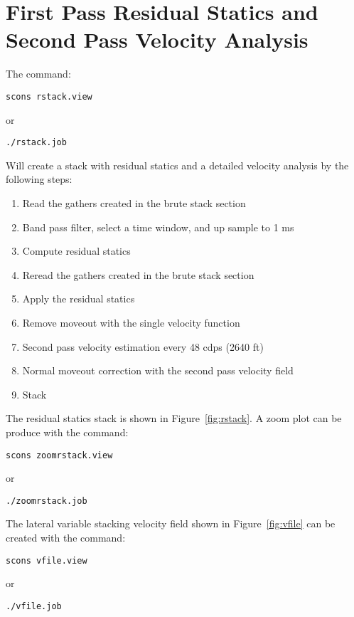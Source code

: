 
\section{First Pass Residual Statics and Second Pass Velocity Analysis}
The command:
\begin{verbatim}
scons rstack.view
\end{verbatim}
or
\begin{verbatim}
./rstack.job
\end{verbatim}
Will create a stack with residual statics and a detailed velocity analysis 
by the following steps:
\begin{enumerate}
\item Read the gathers created in the brute stack section
\item Band pass filter, select a time window, and up sample to 1 ms
\item Compute residual statics
\item Reread the gathers created in the brute stack section
\item Apply the residual statics
\item Remove moveout with the single velocity function 
\item Second pass velocity estimation every 48 cdps (2640 ft)
\item Normal moveout correction with the second pass velocity field 
\item Stack
\end{enumerate}

The residual statics stack is shown in Figure~\ref{fig:rstack}.  A zoom 
plot can be produce with the command:\\
\begin{verbatim}
scons zoomrstack.view
\end{verbatim}
or
\begin{verbatim}
./zoomrstack.job
\end{verbatim}


The lateral variable stacking velocity field shown in Figure~\ref{fig:vfile} 
can be created with the command:\\
\begin{verbatim}
scons vfile.view
\end{verbatim}
or
\begin{verbatim}
./vfile.job
\end{verbatim}

